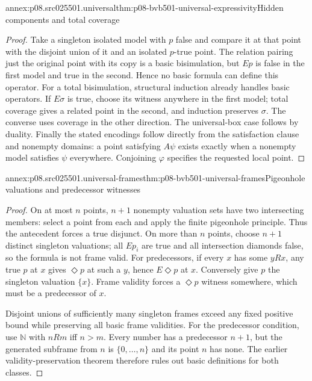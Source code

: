 \begin{annexitem}{annex:p08.src025501.universal}{thm:p08-bvb501-universal-expressivity}{Hidden components and total coverage}
\begin{proof}
Take a singleton isolated model with \(p\) false and compare it
at that point with the disjoint union of it and an isolated \(p\)-true
point. The relation pairing just the original point with its copy is
a basic bisimulation, but \(Ep\) is false in the first model and
true in the second. Hence no basic formula can define this operator.
For a total bisimulation, structural induction already handles basic
operators. If \(E\sigma\) is true, choose its witness anywhere
in the first model; total coverage gives a related point in the second,
and induction preserves \(\sigma\). The converse uses coverage
in the other direction. The universal-box case follows by duality.
Finally the stated encodings follow directly from the satisfaction
clause and nonempty domains: a point satisfying \(A\psi\)
exists exactly when a nonempty model satisfies \(\psi\) everywhere.
Conjoining \(\varphi\) specifies the requested local point.
\end{proof}
\end{annexitem}

\begin{annexitem}{annex:p08.src025501.universal-frames}{thm:p08-bvb501-universal-frames}{Pigeonhole valuations and predecessor witnesses}
\begin{proof}
On at most \(n\) points, \(n+1\) nonempty valuation sets have
two intersecting members: select a point from each and apply the finite
pigeonhole principle. Thus the antecedent forces a true disjunct. On
more than \(n\) points, choose \(n+1\) distinct singleton
valuations; all \(Ep_i\) are true and all intersection diamonds
false, so the formula is not frame valid. For predecessors, if every
\(x\) has some \(yRx\), any true \(p\) at \(x\) gives
\(\Diamond p\) at such a \(y\), hence \(E\Diamond p\)
at \(x\). Conversely give \(p\) the singleton valuation
\(\{x\}\). Frame validity forces a \(\Diamond p\) witness
somewhere, which must be a predecessor of \(x\).

Disjoint unions of sufficiently many singleton frames exceed any fixed
positive bound while preserving all basic frame validities. For the
predecessor condition, use \(\mathbb N\) with \(nRm\)
iff \(n>m\). Every number has a predecessor \(n+1\), but
the generated subframe from \(n\) is \(\{0,\ldots,n\}\)
and its point \(n\) has none. The earlier validity-preservation
theorem therefore rules out basic definitions for both classes.
\end{proof}
\end{annexitem}

